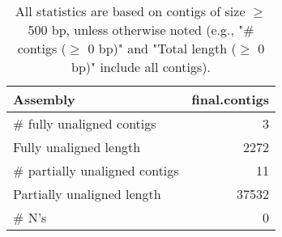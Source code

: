 \documentclass[12pt,a4paper]{article}
\begin{document}
\begin{table}[ht]
\begin{center}
\caption{All statistics are based on contigs of size $\geq$ 500 bp, unless otherwise noted (e.g., "\# contigs ($\geq$ 0 bp)" and "Total length ($\geq$ 0 bp)" include all contigs).}
\begin{tabular}{|l*{1}{|r}|}
\hline
Assembly & final.contigs \\ \hline
\# fully unaligned contigs & 3 \\ \hline
Fully unaligned length & 2272 \\ \hline
\# partially unaligned contigs & 11 \\ \hline
Partially unaligned length & 37532 \\ \hline
\# N's & 0 \\ \hline
\end{tabular}
\end{center}
\end{table}
\end{document}
